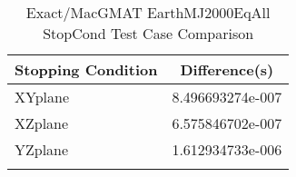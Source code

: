 \begin{table}[htbp!]
\centering
\caption{ Exact/MacGMAT EarthMJ2000EqAll StopCond Test Case Comparison}
      \begin{tabular}{lc}
      \hline\hline
          Stopping Condition & Difference(s) \\
         \hline
         XYplane & 8.496693274e-007 \\
         XZplane & 6.575846702e-007 \\
         YZplane & 1.612934733e-006 \\
      \hline\hline
      \label{Table: Exact-MacGMAT EarthMJ2000EqAll StopCond Table} 
\end{tabular}
\end{table}
